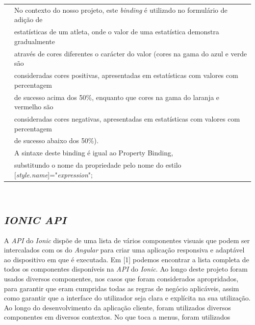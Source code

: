 \begin{tabular}{ll}
	& No contexto do nosso projeto, este \textit{binding} é utilizado no formulário de adição de \\
	&estatísticas de um atleta, onde o valor de uma estatística demonstra gradualmente 
	\\
	&através de cores diferentes o carácter do valor (cores na gama do azul e verde são\\
	& consideradas cores positivas, apresentadas em estatísticas com valores com percentagem \\
	&de sucesso acima dos 50\%, enquanto que cores na gama do laranja e vermelho são\\
	& consideradas cores negativas, apresentadas em estatísticas com valores com percentagem \\
	&de sucesso abaixo dos 50\%). \\
	& A sintaxe deste binding é igual ao Property Binding,\\
	& substitundo o nome da propriedade pelo nome do estilo [\textit{style.name}]="\textit{expression}";\\
\end{tabular}
\\

\subsection{\textit{IONIC API}}\label{subsec414}

A \textit{API} do \textit{Ionic} dispõe de uma lista de vários componentes visuais que podem ser intercalados com os do \textit{Angular} para criar uma aplicação responsiva e adaptável ao dispositivo em que é executada. Em [1] podemos encontrar a lista completa de todos os componentes disponíveis na \textit{API} do \textit{Ionic}. Ao longo deste projeto foram usados diversos componentes, nos casos que foram considerados apropridados, para garantir que eram cumpridas todas as regras de negócio aplicáveis, assim como garantir que a interface do utilizador seja clara e explícita na sua utilização.
Ao longo do desenvolvimento da aplicação cliente, foram utilizados diversos componentes em diversos contextos. No que toca a menus, foram utilizados\\

